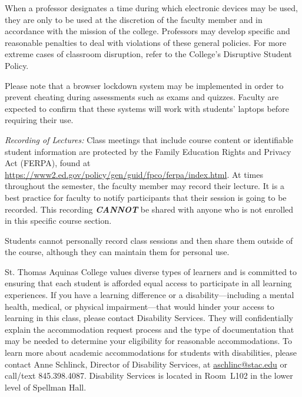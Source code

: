 \documentclass[11pt,letterpaper]{article}
\begin{document}
When a professor designates a time during which electronic devices may be used, they are only to be used at the discretion of the faculty member and in accordance with the mission of the college. Professors may develop specific and reasonable penalties to deal with violations of these general policies. For more extreme cases of classroom disruption, refer to the College's Disruptive Student Policy. \pspace

Please note that a browser lockdown system may be implemented in order to prevent cheating during assessments such as exams and quizzes. Faculty are expected to confirm that these systems will work with students’ laptops before requiring their use. \pspace


{\itshape Recording of Lectures:} Class meetings that include course content or identifiable student information are protected by the Family Education Rights and Privacy Act (FERPA), found at \url{https://www2.ed.gov/policy/gen/guid/fpco/ferpa/index.html}. At times throughout the semester, the faculty member may record their lecture. It is a best practice for faculty to notify participants that their session is going to be recorded. This recording \textit{\textbf{CANNOT}} be shared with anyone who is not enrolled in this specific course section. \pspace

Students cannot personally record class sessions and then share them outside of the course, although they can maintain them for personal use. \sectionbreak




St. Thomas Aquinas College values diverse types of learners and is committed to ensuring that each student is afforded equal access to participate in all learning experiences. If you have a learning difference or a disability---including a mental health, medical, or physical impairment---that would hinder your access to learning in this class, please contact Disability Services. They will confidentially explain the accommodation request process and the type of documentation that may be needed to determine your eligibility for reasonable accommodations. To learn more about academic accommodations for students with disabilities, please contact Anne Schlinck, Director of Disability Services, at \href{mailto:aschlinc@stac.edu}{aschlinc@stac.edu} or call/text 845.398.4087. Disability Services is located in Room~L102 in the lower level of Spellman Hall. \pspace
\end{document}

